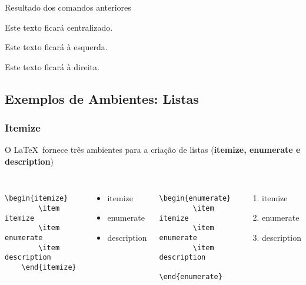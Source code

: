 \begin{frame}
\begin{block}{Resultado dos comandos anteriores}
\end{block}

\begin{center}
Este texto ficará centralizado.
\end{center}

\begin{flushleft}
Este texto ficará à esquerda.
\end{flushleft}

\begin{flushright}
Este texto ficará à direita.
\end{flushright}
\end{frame}

\subsection*{Exemplos de Ambientes: Listas} %

\subsubsection*{Itemize} %
\label{ssub:itemize}

\begin{frame}[fragile]
O \LaTeX~fornece três ambientes para a criação de listas ({\bf itemize, enumerate e description})


\begin{columns}
\column[t]{6cm}
\begin{verbatim}
    \begin{itemize}
        \item itemize
        \item enumerate
        \item description
    \end{itemize}
\end{verbatim}
\begin{itemize}
    \item itemize
    \item enumerate
    \item description
\end{itemize}
\column[t]{6cm}
\begin{verbatim}
    \begin{enumerate}
        \item itemize
        \item enumerate
        \item description
    \end{enumerate}
\end{verbatim}
\begin{enumerate}
\item itemize
\item enumerate
\item description
\end{enumerate}

\end{columns}
\end{frame}


